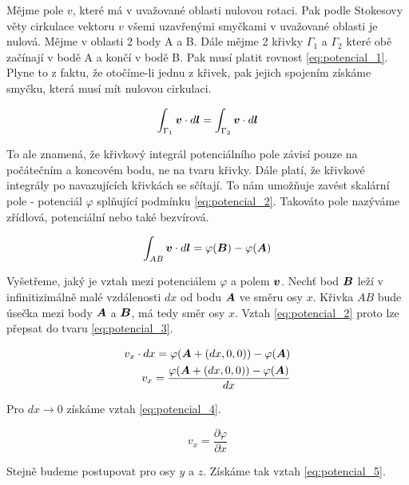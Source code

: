 Mějme pole \(v\), které má v uvažované oblasti nulovou rotaci. Pak podle Stokesovy věty cirkulace vektoru \(v\) všemi uzavřenými smyčkami v uvažované
oblasti je nulová. Mějme v oblasti 2 body A a B. Dále mějme 2 křivky \(\Gamma_1\) a \(\Gamma_2\) které obě začínají v bodě A a končí v bodě B. Pak musí platit rovnost \eqref{eq:potencial_1}. Plyne to z faktu, že otočíme-li jednu z křivek, pak jejich spojením získáme smyčku, která musí mít nulovou cirkulaci.

\begin{equation}
\label{eq:potencial_1}
\int_{\Gamma_1} \boldsymbol{v} \cdot d\boldsymbol{l} = \int_{\Gamma_2} \boldsymbol{v} \cdot d\boldsymbol{l}
\end{equation}

To ale znamená, že křivkový integrál potenciálního pole závisí pouze na počátečním a koncovém bodu, ne na tvaru křivky. Dále platí, že křivkové integrály po navazujících křivkách se sčítají. To nám umožňuje zavést skalární pole - potenciál \(\varphi\) splňující podmínku \eqref{eq:potencial_2}. Takováto pole nazýváme zřídlová, potenciální nebo také bezvírová.

\begin{equation}
\label{eq:potencial_2}
\int_{AB} \boldsymbol{v} \cdot d\boldsymbol{l} = \varphi(\boldsymbol{B}) - \varphi(\boldsymbol{A})
\end{equation}

Vyšetřeme, jaký je vztah mezi potenciálem \(\varphi\) a polem \(\boldsymbol{v}\). Nechť bod \(\boldsymbol{B}\) leží v infinitizimálně malé vzdálenosti \(dx\) od bodu
\(\boldsymbol{A}\) ve směru osy \(x\). Křivka \(AB\) bude úsečka mezi body \(\boldsymbol{A}\) a \(\boldsymbol{B}\), má tedy směr osy \(x\). Vztah \eqref{eq:potencial_2} proto lze přepsat do tvaru \eqref{eq:potencial_3}.

\begin{equation}
\label{eq:potencial_3}
\begin{split}
v_x \cdot dx = \varphi(\boldsymbol{A} + (dx, 0, 0)) - \varphi(\boldsymbol{A}) \\
v_x = \frac{\varphi(\boldsymbol{A} + (dx, 0, 0)) - \varphi(\boldsymbol{A})}{dx}
\end{split}
\end{equation}

Pro \(dx \rightarrow 0\) získáme vztah \eqref{eq:potencial_4}.

\begin{equation}
\label{eq:potencial_4}
v_x = \frac{\partial \varphi}{\partial x}
\end{equation}

Stejně budeme postupovat pro osy \(y\) a \(z\). Získáme tak vztah \eqref{eq:potencial_5}.

